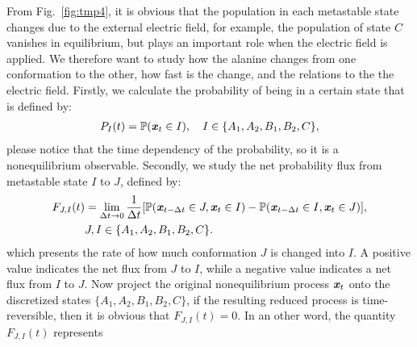 \documentclass[a4paper,preprint,unsortedaddress,onecolumn]{revtex4-1}
\newcommand{\vect}[1]{\textbf{\textit{#1}}}
\newcommand{\fwd}[0]{\textrm{fwd}}
\newcommand{\bwd}[0]{\textrm{bwd}}
\begin{document}
From Fig.~\ref{fig:tmp4}, it is obvious that the population in each
metastable state changes due to the external electric field, for
example, the population of state $C$ vanishes in equilibrium,
but plays an important role when the electric field is applied. We
therefore want to study how the alanine changes from one conformation
to the other, how fast is the change, and the relations to the 
the electric field. 
Firstly, we calculate the probability of being in a certain state that
is defined by:
\begin{align}
  P_I(t) = \mathbb P (\vect x_t \in I), \quad  I \in \{A_1, A_2, B_1, B_2, C\},
\end{align}
please notice that the time dependency of the probability, so it is
a nonequilibrium observable.
Secondly,
we study the net probability flux from metastable state $I$ to $J$, defined by:
\begin{align}\nonumber
  F_{J,I}(t) & =\lim_{\Delta t\rightarrow 0} \frac1{\Delta t} [\mathbb P( \vect x_{t-\Delta t} \in J, \vect x_t \in I) - \mathbb P( \vect x_{t-\Delta t} \in I, \vect x_t \in J)], \\\label{eqn:tmp7}
  & J,I \in \{A_1, A_2, B_1, B_2, C\}.
\end{align}
which presents the rate of how much conformation $J$ is changed
into $I$. A positive value indicates the
net flux from $J$ to $I$,
while a negative value indicates a net flux from $I$ to $J$.
Now project the original nonequilibrium process $\vect x_t$
onto the discretized states $\{A_1, A_2, B_1, B_2, C\}$,
if the resulting reduced process 
is time-reversible, then it is obvious that
$ F_{J,I}(t) = 0$. In an other word, the quantity $ F_{J,I}(t) $ represents
\end{document}
